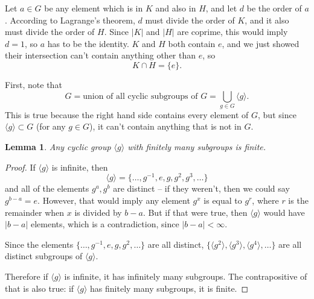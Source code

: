 \documentclass[12pt]{article}
\newtheorem{lem}[thm]{Lemma}
\begin{document}
\bigskip
\noindent{}\bigskip

Let $a \in G$ be any element which is in $K$ and also in $H$, and let $d$ be the order of $a$. According to Lagrange's theorem, $d$ must divide the order of $K$, and it also must divide the order of $H$. Since $|K|$ and $|H|$ are coprime, this would imply $d=1$, so $a$ has to be the identity. $K$ and $H$ both contain $e$, and we just showed their intersection can't contain anything other than $e$, so
\[ K \cap H = \{ e \}. \]

\bigskip
\noindent{}\bigskip

First, note that
\[ G = \text{union of all cyclic subgroups of $G$} = \bigcup_{g \in G} \langle g \rangle. \]
This is true because the right hand side contains every element of $G$, but since $\langle g \rangle \subset G$ (for any $g \in G$), it can't contain anything that is not in $G$.

\begin{lem}
    Any cyclic group $\langle g \rangle$ with finitely many subgroups is finite.
\end{lem}
\begin{proof}
    If $\langle g \rangle$ is infinite, then
    \[ \langle g \rangle = \{ \dots, g^{-1}, e, g, g^2, g^3, \dots \} \]
    and all of the elements $g^a, g^b$ are distinct -- if they weren't, then we could say $g^{b-a} = e$. However, that would imply any element $g^x$ is equal to $g^r$, where $r$ is the remainder when $x$ is divided by $b-a$. But if that were true, then $\langle g \rangle$ would have $|b-a|$ elements, which is a contradiction, since $|b-a| < \infty$.
    \par
    Since the elements $\{ \dots, g^{-1}, e, g, g^2, \dots \}$ are all distinct, $\{ \langle g^2 \rangle, \langle g^3 \rangle, \langle g^4 \rangle, \dots \}$ are all distinct subgroups of $\langle g \rangle$.
    \par
    Therefore if $\langle g \rangle$ is infinite, it has infinitely many subgroups. The contrapositive of that is also true: if $\langle g \rangle$ has finitely many subgroups, it is finite.
\end{proof}
\end{document}
